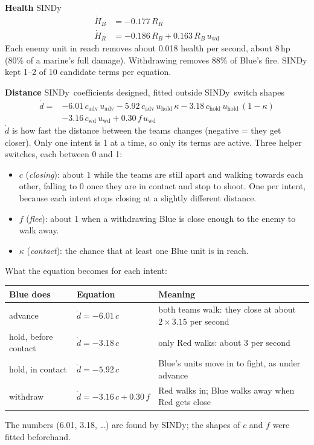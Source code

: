 \documentclass[11pt,a4paper]{article}
\newcommand{\tagbox}[2]{\colorbox{#1!12}{\textcolor{#1}{\footnotesize\textsf{#2}}}}
\newcommand{\sindy}{\tagbox{sindy}{SINDy}}
\newcommand{\designed}{\tagbox{designed}{designed, fitted outside SINDy}}
\begin{document}
\textbf{Health} \hfill \sindy
\begin{align*}
  \dot H_B &= -0.177\, R_R \\
  \dot H_R &= -0.186\, R_B + 0.163\, R_B\, u_{\text{wd}}
\end{align*}
Each enemy unit in reach removes about 0.018 health per second, about 8\,hp (80\% of a marine's full
damage).
Withdrawing removes 88\% of Blue's fire. SINDy kept 1--2 of 10 candidate terms per equation.

\textbf{Distance} \hfill \sindy\ coefficients \quad \designed\ switch shapes
\begin{align*}
  \dot d = {} & -6.01\, c_{\text{adv}}\, u_{\text{adv}}
             - 5.92\, c_{\text{adv}}\, u_{\text{hold}}\, \kappa
             - 3.18\, c_{\text{hold}}\, u_{\text{hold}}\, (1-\kappa) \\
           & - 3.16\, c_{\text{wd}}\, u_{\text{wd}}
             + 0.30\, f\, u_{\text{wd}}
\end{align*}
$\dot d$ is how fast the distance between the teams changes (negative = they get closer). Only one
intent is 1 at a time, so only its terms are active. Three helper switches, each between 0 and 1:
\begin{itemize}
  \item $c$ (\emph{closing}): about 1 while the teams are still apart and walking towards each other,
        falling to 0 once they are in contact and stop to shoot. One per intent, because each intent
        stops closing at a slightly different distance.
  \item $f$ (\emph{flee}): about 1 when a withdrawing Blue is close enough to the enemy to walk away.
  \item $\kappa$ (\emph{contact}): the chance that at least one Blue unit is in reach.
\end{itemize}
What the equation becomes for each intent:

\begin{center}
\renewcommand{\arraystretch}{1.25}
\begin{tabular}{@{}lll@{}}
\toprule
\textbf{Blue does} & \textbf{Equation} & \textbf{Meaning} \\
\midrule
advance & $\dot d = -6.01\, c$ & both teams walk: they close at about $2 \times 3.15$ per second \\
hold, before contact & $\dot d = -3.18\, c$ & only Red walks: about 3 per second \\
hold, in contact & $\dot d = -5.92\, c$ & Blue's units move in to fight, as under advance \\
withdraw & $\dot d = -3.16\, c + 0.30\, f$ & Red walks in; Blue walks away when Red gets close \\
\bottomrule
\end{tabular}
\end{center}
The numbers (6.01, 3.18, \dots) are found by SINDy; the shapes of $c$ and $f$ were fitted beforehand.
\end{document}
